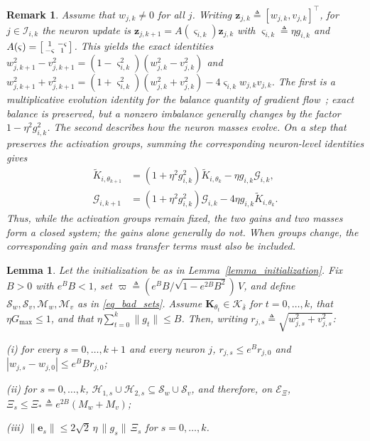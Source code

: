 \documentclass[letterpaper, 10 pt, conference]{ieeeconf}
\newcommand{\be}{\mathbf{e}}
\newcommand{\bz}{\mathbf{z}}
\newcommand{\bK}{\mathbf{K}}
\newcommand{\cE}{\mathcal{E}}
\newcommand{\cG}{\mathcal{G}}
\newcommand{\cK}{\mathcal{K}}
\newcommand{\cM}{\mathcal{M}}
\newcommand{\cS}{\mathcal{S}}
\newcommand{\sI}{\mathscr{I}}
\newcommand{\sH}{\mathscr{H}}
\newtheorem{remark}{Remark}
\newtheorem{lemma}{Lemma}
\newcommand{\Lemm}{Lemma}
\begin{document}
\begin{remark}\label{remark_balancedness}
    Assume that $w_{j,k} \neq 0$ for all $j$. Writing $\bz_{j,k} \triangleq [w_{j,k},v_{j,k}]^{\top}$, for $j\in\sI_{i,k}$ the neuron update is $\bz_{j,k+1} = A(\varsigma_{i,k})\bz_{j,k}$ with $\varsigma_{i,k} \triangleq \eta g_{i,k}$ and $A(\varsigma)=\begin{bsmallmatrix}1&-\varsigma\\-\varsigma&1\end{bsmallmatrix}$. This yields the exact identities
    $
        w_{j,k+1}^{2} - v_{j,k+1}^{2} = (1-\varsigma_{i,k}^{2})(w_{j,k}^{2} - v_{j,k}^{2})
    $
    and
    $
        w_{j,k+1}^{2} + v_{j,k+1}^{2} = (1+\varsigma_{i,k}^{2})(w_{j,k}^{2}+v_{j,k}^{2}) - 4\varsigma_{i,k}w_{j,k}v_{j,k}
    $.
    The first is a multiplicative evolution identity for the balance quantity of gradient flow~\cite{du2018algorithmic,arora2018optimization}; exact balance is preserved, but a nonzero imbalance generally changes by the factor $1-\eta^2g_{i,k}^2$. The second describes how the neuron masses evolve. On a step that preserves the activation groups, summing the corresponding neuron-level identities gives
    \begin{equation}\label{eq_coupled_gain_mass}
       \begin{aligned}
       \widetilde K_{i,\theta_{k+1}}
          &=(1+\eta^2g_{i,k}^2)\widetilde K_{i,\theta_k}
             -\eta g_{i,k}\cG_{i,k},\\
       \cG_{i,k+1}
          &=(1+\eta^2g_{i,k}^2)\cG_{i,k}
             -4\eta g_{i,k}\widetilde K_{i,\theta_k}.
       \end{aligned}
    \end{equation}
    Thus, while the activation groups remain fixed, the two gains and two masses form a closed system; the gains alone generally do not. When groups change, the corresponding gain and mass transfer terms must also be included.
\end{remark}
 
\begin{lemma}\label{lemma_sign_stability}
    Let the initialization be as in \Lemm~\ref{lemma_initialization}. Fix $B > 0$ with $e^{B} B < 1$, set $\varpi \triangleq ({e^{B} B}/{\sqrt{1 - e^{2B} B^{2}}})\,V$, and define $\cS_{w}, \cS_{v}, \cM_{w}, \cM_{v}$ as in \eqref{eq_bad_sets}. Assume $\bK_{\theta_{t}} \in \cK_{\overline{\delta}}$ for $t=0,\dots,k$, that $\eta G_{\max} \le 1$, and that $\eta \sum_{t=0}^{k} \|g_{t}\| \le B$. Then, writing $r_{j,s} \triangleq \sqrt{w_{j,s}^{2} + v_{j,s}^{2}}$:
 
    (i) for every $s=0,\ldots,k+1$ and every neuron $j$,
    $r_{j,s} \le e^{B} r_{j,0}$ and $|w_{j,s} - w_{j,0}| \le e^{B} Br_{j,0}$;
 
    (ii) for $s = 0,\ldots, k$, $\sH_{1,s} \cup \sH_{2,s} \subseteq \cS_{w} \cup \cS_{v}$, and therefore, on $\cE_{\Xi}$, $\Xi_{s} \le \Xi_{\ast} \triangleq e^{2B} (M_{w} + M_{v})$;
 
    (iii) $\| \be_{s} \| \le 2 \sqrt{2} \, \eta\, \|g_s\| \, \Xi_{s}$ for $s = 0,\ldots, k$.
\end{lemma}
 
\end{document}
